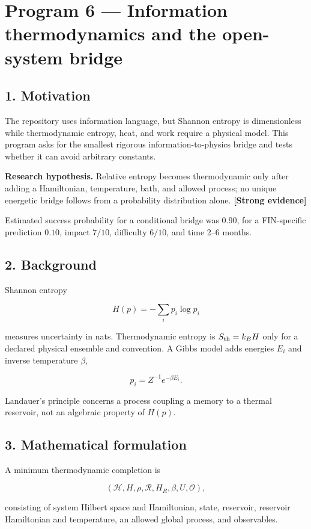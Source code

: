 \documentclass[11pt,a4paper,openany]{report}
\newcommand{\statusStrong}{\textcolor{finblue}{[Strong evidence]}}
\begin{document}
\chapter{Program 6 — Information thermodynamics and the open-system bridge}

\section{1. Motivation}

The repository uses information language, but Shannon entropy is dimensionless while thermodynamic entropy, heat, and work require a physical model. This program asks for the smallest rigorous information-to-physics bridge and tests whether it can avoid arbitrary constants.

\textbf{Research hypothesis.} Relative entropy becomes thermodynamic only after adding a Hamiltonian, temperature, bath, and allowed process; no unique energetic bridge follows from a probability distribution alone. \textbf{\statusStrong{}}

Estimated success probability for a conditional bridge was \(0.90\), for a FIN-specific prediction \(0.10\), impact \(7/10\), difficulty \(6/10\), and time 2–6 months.

\section{2. Background}

Shannon entropy

\[
H(p)=-\sum_i p_i\log p_i
\]

measures uncertainty in nats. Thermodynamic entropy is \(S_{\rm th}=k_BH\) only for a declared physical ensemble and convention. A Gibbs model adds energies \(E_i\) and inverse temperature \(\beta\),

\[
p_i=Z^{-1}e^{-\beta E_i}.
\]

Landauer's principle concerns a process coupling a memory to a thermal reservoir, not an algebraic property of \(H(p)\).

\section{3. Mathematical formulation}

A minimum thermodynamic completion is

\[
(\mathcal H,H,\rho,\mathcal R,H_R,\beta,U,\mathcal O),
\]

consisting of system Hilbert space and Hamiltonian, state, reservoir, reservoir Hamiltonian and temperature, an allowed global process, and observables.
\end{document}
